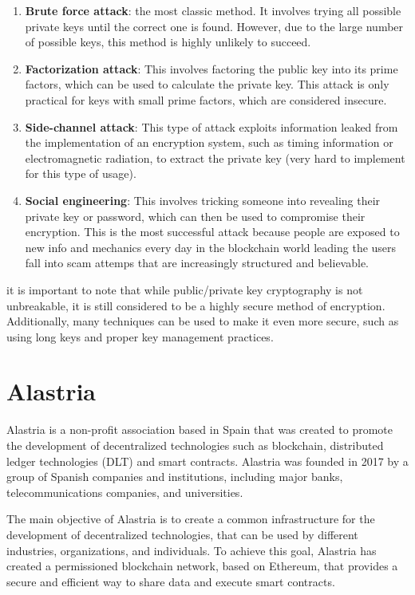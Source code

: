\documentclass[target=mst,aauheader=]{thud}
\begin{document}
    \begin{enumerate}

        \item \textbf{Brute force attack}: the most classic method. It involves trying all possible private keys until the correct one is found. However, due to the large number of possible keys, this method is highly unlikely to succeed.
        \item \textbf{Factorization attack}: This involves factoring the public key into its prime factors, which can be used to calculate the private key. This attack is only practical for keys with small prime factors, which are considered insecure.
        \item \textbf{Side-channel attack}: This type of attack exploits information leaked from the implementation of an encryption system, such as timing information or electromagnetic radiation, to extract the private key (very hard to implement for this type of usage).
        \item \textbf{Social engineering}: This involves tricking someone into revealing their private key or password, which can then be used to compromise their encryption. This is the most successful attack because people are exposed to new info and mechanics every day in the blockchain world leading the users fall into scam attemps that are increasingly structured and believable.

    \end{enumerate}

    it is important to note that while public/private key cryptography is not unbreakable, it is still considered to be a highly secure method of encryption. Additionally, many techniques can be used to make it even more secure, such as using long keys and proper key management practices.
    
    \section{Alastria}

    Alastria is a non-profit association based in Spain that was created to promote the development of decentralized technologies such as blockchain, distributed ledger technologies (DLT) and smart contracts. Alastria was founded in 2017 by a group of Spanish companies and institutions, including major banks, telecommunications companies, and universities.

    The main objective of Alastria is to create a common infrastructure for the development of decentralized technologies, that can be used by different industries, organizations, and individuals. To achieve this goal, Alastria has created a permissioned blockchain network, based on Ethereum, that provides a secure and efficient way to share data and execute smart contracts.
\end{document}
